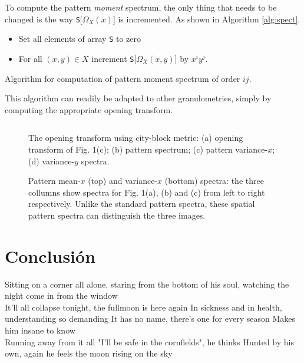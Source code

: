 \documentclass{sciposter}
\begin{document}
\begin{multicols}{3}
To compute the pattern \emph{moment} spectrum, the only thing that needs to be
changed is the way {\tt S}[$\Omega_X(x)$] is incremented. As shown in Algorithm
\ref{alg:spect}.

\begin{algorithm}
\begin{itemize}
\item Set all elements of array {\tt S} to zero
\item For all $(x,y) \in X$ increment {\tt S}[$\Omega_X(x,y)$] by 
$x^iy^j$. 
\end{itemize}
\caption{ Algorithm for computation of pattern moment
spectrum of order $ij$. \label{alg:spect}}
\end{algorithm}

This algorithm can 
readily be adapted to other granulometries, simply by computing the 
appropriate opening transform.

\begin{figure}
\begin{center}
\begin{tabular}{c c}

\end{tabular}
\end{center}
\caption{ \label{fig:tauspect} 
The opening transform using city-block metric: (a) opening transform of
Fig. 1(c); (b) pattern spectrum; (c) pattern variance-$x$; 
(d) variance-$y$ spectra.}
\end{figure}


\renewcommand{\imsize}{0.3\columnwidth}
\begin{figure}
\begin{center}
\end{center}
\caption{ \label{fig:binspect} Pattern mean-$x$ (top) and variance-$x$ 
(bottom) spectra: the three collumns show spectra for Fig. 1(a), (b) and (c) 
from left to right respectively.  Unlike the standard pattern spectra, 
these spatial pattern spectra can distinguish the three images.}
\end{figure}

\section{Conclusión}

Sitting on a corner all alone,
staring from the bottom of his soul,
watching the night come in from the window
\\
It'll all collapse tonight, the fullmoon is here again
In sickness and in health, understanding so demanding
It has no name, there's one for every season
Makes him insane to know
\\
Running away from it all
"I'll be safe in the cornfields", he thinks
Hunted by his own,
again he feels the moon rising on the sky


\end{multicols}
\end{document}
